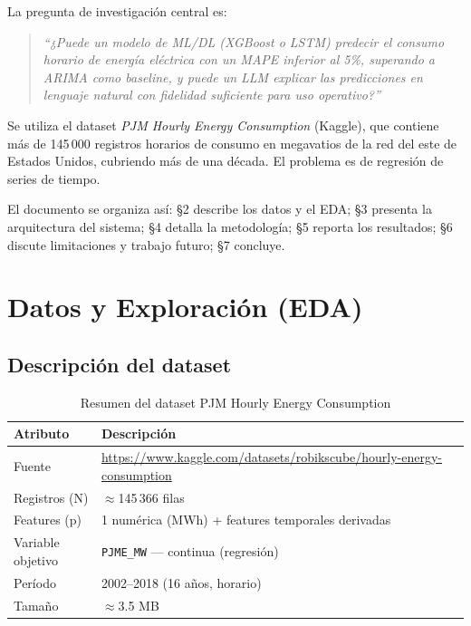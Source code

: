 \documentclass[10pt,twocolumn]{article}
\begin{document}
La pregunta de investigación central es:

\begin{quote}
  \textit{``¿Puede un modelo de ML/DL (XGBoost o LSTM)
  predecir el consumo horario de energía eléctrica con un
  MAPE inferior al 5\%, superando a ARIMA como baseline,
  y puede un LLM explicar las predicciones en lenguaje
  natural con fidelidad suficiente para uso operativo?''}
\end{quote}

Se utiliza el dataset \textit{PJM Hourly Energy Consumption}
(Kaggle), que contiene más de 145\,000 registros horarios de
consumo en megavatios de la red del este de Estados Unidos,
cubriendo más de una década. El problema es de regresión
de series de tiempo.

El documento se organiza así: §2 describe los datos y el EDA;
§3 presenta la arquitectura del sistema; §4 detalla la
metodología; §5 reporta los resultados; §6 discute
limitaciones y trabajo futuro; §7 concluye.

\section{Datos y Exploración (EDA)}

\subsection{Descripción del dataset}

\begin{table}[H]
\centering
\caption{Resumen del dataset PJM Hourly Energy Consumption}
\label{tab:dataset}
\begin{tabularx}{\columnwidth}{lX}
\toprule
\textbf{Atributo} & \textbf{Descripción} \\
\midrule
Fuente & \url{https://www.kaggle.com/datasets/robikscube/hourly-energy-consumption} \\
Registros (N) & $\approx$145\,366 filas \\
Features (p) & 1 numérica (MWh) + features temporales derivadas \\
Variable objetivo & \texttt{PJME\_MW} — continua (regresión) \\
Período & 2002--2018 (16 años, horario) \\
Tamaño & $\approx$3.5 MB \\
\bottomrule
\end{tabularx}
\end{table}
\end{document}
